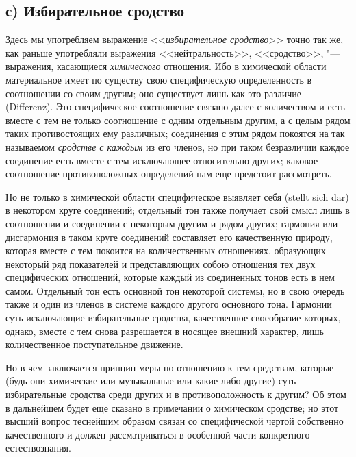 \subsection[с) Избирательное сродство]{с) Избирательное сродство}
Здесь мы употребляем выражение
<<{\em избирательное сродство}>> точно так же, как раньше употребляли
выражения <<нейтральность>>, <<сродство>>, "--- выражения, касающиеся
{\em химического} отношения. Ибо в химической области
материальное имеет по существу свою специфическую определенность в
соотношении со своим другим; оно существует лишь как это различие
(Differenz). Это специфическое соотношение связано далее с количеством и
есть вместе с тем не только соотношение с одним отдельным другим, а с целым
рядом таких противостоящих ему различных; соединения с этим рядом покоятся
на так называемом {\em сродстве с каждым} из его
членов, но при таком безразличии каждое соединение есть вместе с тем
исключающее относительно других; каковое соотношение противоположных
определений нам еще предстоит рассмотреть.

Но не только в химической области специфическое выявляет себя (stellt sich
dar) в некотором круге соединений; отдельный тон также получает свой смысл
лишь в соотношении и соединении с некоторым другим и рядом других; гармония
или дисгармония в таком круге соединений составляет его качественную
природу, которая вместе с тем покоится на количественных отношениях,
образующих некоторый ряд показателей и представляющих собою отношения тех
двух специфических отношений, которые каждый из соединенных тонов есть в
нем самом. Отдельный тон есть основной тон некоторой системы, но в свою
очередь также и один из членов в системе каждого другого основного тона.
Гармонии суть исключающие избирательные сродства, качественное своеобразие
которых, однако, вместе с тем снова разрешается в носящее внешний характер,
лишь количественное поступательное движение.

Но в чем заключается принцип меры по отношению к тем средствам, которые
(будь они химические или музыкальные или какие-либо другие) суть
избирательные сродства среди других и в противоположность к другим? Об этом
в дальнейшем будет еще сказано в примечании о химическом сродстве; но этот
высший вопрос теснейшим образом связан со специфической чертой собственно
качественного и должен рассматриваться в особенной части конкретного
естествознания.

